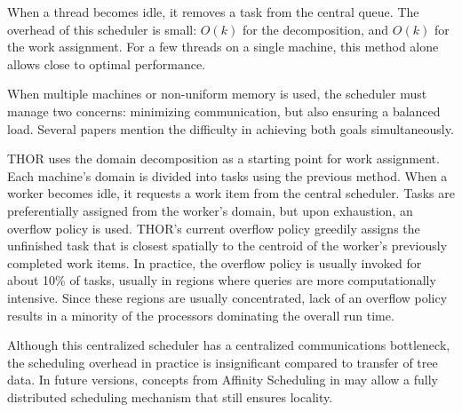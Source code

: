 \documentclass[twoside,leqno,twocolumn]{article}
\newcommand{\authornote}[1]{(\footnote{Note to self: #1})}
\newcommand{\authorsnote}[1]{\authornote{#1}}
\begin{document}
When a thread becomes idle, it removes a task from the central queue.
The overhead of this scheduler is small: $O(k)$ for the decomposition, and $O(k)$ for the work assignment.
For a few threads on a single machine, this method alone allows close to optimal performance.

When multiple machines or non-uniform memory is used, the scheduler must manage two concerns: minimizing communication, but also ensuring a balanced load.
Several papers \cite{markatos92using, salmon_thesis} mention the difficulty in achieving both goals simultaneously.

THOR uses the domain decomposition as a starting point for work assignment.
Each machine's domain is divided into tasks using the previous method.
When a worker becomes idle, it requests a work item from the central scheduler.
Tasks are preferentially assigned from the worker's domain, but upon exhaustion, an overflow policy is used.
THOR's current overflow policy greedily assigns the unfinished task that is closest spatially to the centroid of the worker's previously completed work items.
In practice, the overflow policy is usually invoked for about 10\% of tasks, usually in regions where queries are more computationally intensive.
Since these regions are usually concentrated, lack of an overflow policy results in a minority of the processors dominating the overall run time.

Although this centralized scheduler has a centralized communications bottleneck, the scheduling overhead in practice is insignificant compared to transfer of tree data.
In future versions, concepts from Affinity Scheduling in \cite{markatos92using} may allow a fully distributed scheduling mechanism that still ensures locality.

\end{document}
